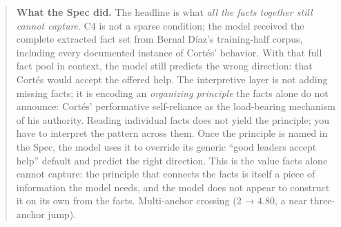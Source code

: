 \begin{quote}
\textbf{What the Spec did.} The headline is what \emph{all the facts
together still cannot capture}. C4 is not a sparse condition; the model
received the complete extracted fact set from Bernal Díaz's
training-half corpus, including every documented instance of Cortés'
behavior. With that full fact pool in context, the model still predicts
the wrong direction: that Cortés would accept the offered help. The
interpretive layer is not adding missing facts; it is encoding an
\emph{organizing principle} the facts alone do not announce: Cortés'
performative self-reliance as the load-bearing mechanism of his
authority. Reading individual facts does not yield the principle; you
have to interpret the pattern across them. Once the principle is named
in the Spec, the model uses it to override its generic ``good leaders
accept help'' default and predict the right direction. This is the value
facts alone cannot capture: the principle that connects the facts is
itself a piece of information the model needs, and the model does not
appear to construct it on its own from the facts. Multi-anchor crossing
(2 → 4.80, a near three-anchor jump).
\end{quote}

